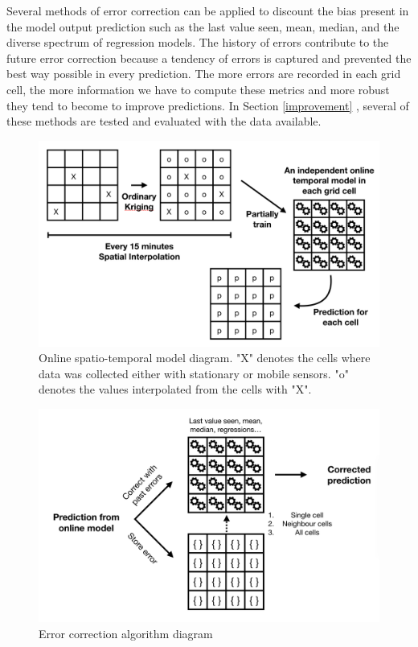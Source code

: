 Several methods of error correction can be applied to discount the bias present in the model output prediction such as the last value seen, mean, median, and the diverse spectrum of regression models. The history of errors contribute to the future error correction because a tendency of errors is captured and prevented the best way possible in every prediction. The more errors are recorded in each grid cell, the more information we have to compute these metrics and more robust they tend to become to improve predictions. In Section \ref{improvement}
, several of these methods are tested and evaluated with the data available.


\begin{figure}[H] 
\centering
\vspace{1cm}
\includegraphics[width=\linewidth]{images/model_diagram.png} 
\caption{Online spatio-temporal model diagram. "X" denotes the cells where data was collected either with stationary or mobile sensors. "o" denotes the values interpolated from the cells with "X".}
\label{fig:model_diagram}
\vspace{1cm}
\end{figure}

\begin{figure}[H]
\centering
\includegraphics[width=\linewidth]{images/error_correction_diagram.png} 
\caption{Error correction algorithm diagram}
\label{fig:error_diagram}
\end{figure}


